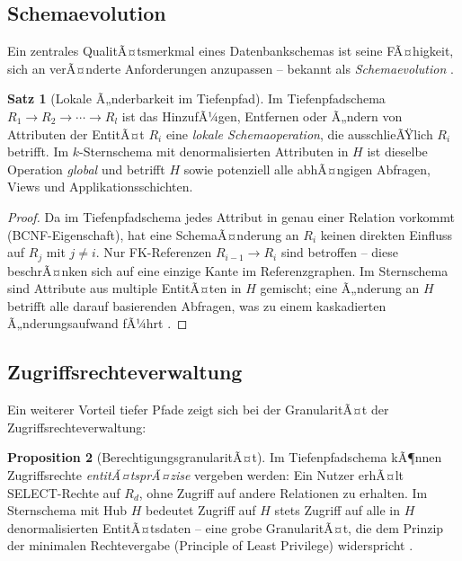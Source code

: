 ﻿\documentclass[a4paper,12pt]{report}
\theoremstyle{definition}
\newtheorem{theorem}{Satz}[chapter]
\newtheorem{proposition}[theorem]{Proposition}
\theoremstyle{remark}
\begin{document}
\subsection{Schemaevolution}

Ein zentrales QualitÃ¤tsmerkmal eines Datenbankschemas ist seine
FÃ¤higkeit, sich an verÃ¤nderte Anforderungen anzupassen -- bekannt als
\emph{Schemaevolution} \cite{Roddick1995}.

\begin{theorem}[Lokale Ã„nderbarkeit im Tiefenpfad]
\label{thm:schaemaevolution}
Im Tiefenpfadschema $R_1 \to R_2 \to \cdots \to R_l$ ist das HinzufÃ¼gen,
Entfernen oder Ã„ndern von Attributen der EntitÃ¤t $R_i$ eine
\emph{lokale Schemaoperation}, die ausschlieÃŸlich $R_i$ betrifft.
Im $k$-Sternschema mit denormalisierten Attributen in $H$ ist dieselbe
Operation \emph{global} und betrifft $H$ sowie potenziell alle
abhÃ¤ngigen Abfragen, Views und Applikationsschichten.
\end{theorem}

\begin{proof}
Da im Tiefenpfadschema jedes Attribut in genau einer Relation vorkommt
(BCNF-Eigenschaft), hat eine SchemaÃ¤nderung an $R_i$ keinen direkten
Einfluss auf $R_j$ mit $j \neq i$. Nur FK-Referenzen
$R_{i-1} \to R_i$ sind betroffen -- diese beschrÃ¤nken sich auf eine
einzige Kante im Referenzgraphen. Im Sternschema sind Attribute aus
multiple EntitÃ¤ten in $H$ gemischt; eine Ã„nderung an $H$ betrifft
alle darauf basierenden Abfragen, was zu einem kaskadierten
Ã„nderungsaufwand fÃ¼hrt \cite{Ambler2003}.
\end{proof}

\subsection{Zugriffsrechteverwaltung}

Ein weiterer Vorteil tiefer Pfade zeigt sich bei der GranularitÃ¤t der
Zugriffsrechteverwaltung:

\begin{proposition}[BerechtigungsgranularitÃ¤t]
Im Tiefenpfadschema kÃ¶nnen Zugriffsrechte \emph{entitÃ¤tsprÃ¤zise} vergeben
werden: Ein Nutzer erhÃ¤lt SELECT-Rechte auf $R_d$, ohne Zugriff auf andere
Relationen zu erhalten. Im Sternschema mit Hub $H$ bedeutet Zugriff auf
$H$ stets Zugriff auf alle in $H$ denormalisierten EntitÃ¤tsdaten --
eine grobe GranularitÃ¤t, die dem Prinzip der minimalen Rechtevergabe
(Principle of Least Privilege) widerspricht \cite{Saltzer1975}.
\end{proposition}
\end{document}
